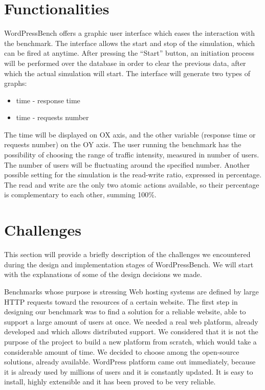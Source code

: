 \section{Functionalities}
\label{sec:functionalities}

WordPressBench offers a graphic user interface which eases the interaction with the benchmark. The interface allows the start and stop of the simulation, which can be fired at anytime. After pressing the “Start” button, an initiation process will be performed over the database in order to clear the previous data, after which the actual simulation will start. 
The interface will generate two types of graphs: 
\begin{itemize}
 \item time - response time 
 \item time - requests number
\end{itemize}
The time will be displayed on OX axis, and the other variable (response time or requests number) on the OY axis.
The user running the benchmark has the possibility of choosing the range of  traffic intensity, measured in number of users. The number of users will be fluctuating around the specified number. Another possible setting for the simulation is the read-write ratio, expressed in percentage. The read and write are the only two atomic actions available, so their percentage is complementary to each other, summing 100\%.

\section{Challenges}
\label{sec:challenges}

This section will provide a briefly description of the challenges we encountered during the design and implementation stages of WordPressBench. We will start with the explanations of some of the design decisions we made.

Benchmarks whose purpose is stressing Web hosting systems are defined by large HTTP requests toward the resources of a certain website. The first step in designing our benchmark was to find a solution for a reliable website, able to support a large amount of users at once. We needed a real web platform, already developed and which allows distributed support. We considered that it is not the purpose of the project to build a new platform from scratch, which would take a considerable amount of time. We decided to choose among the open-source solutions, already available. WordPress platform came out immediately, because it is already used by millions of users and it is constantly updated. It is easy to install, highly extensible and it has been proved to be very reliable.

